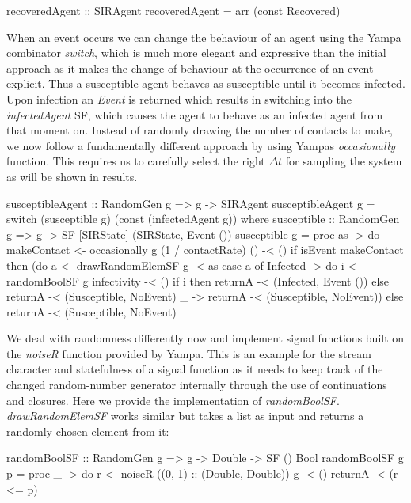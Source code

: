 \begin{HaskellCode}
recoveredAgent :: SIRAgent
recoveredAgent = arr (const Recovered)
\end{HaskellCode}

When an event occurs we can change the behaviour of an agent using the Yampa combinator \textit{switch}, which is much more elegant and expressive than the initial approach as it makes the change of behaviour at the occurrence of an event explicit. Thus a susceptible agent behaves as susceptible until it becomes infected. Upon infection an \textit{Event} is returned which results in switching into the \textit{infectedAgent} SF, which causes the agent to behave as an infected agent from that moment on. Instead of randomly drawing the number of contacts to make, we now follow a fundamentally different approach by using Yampas \textit{occasionally} function. This requires us to carefully select the right $\Delta t$ for sampling the system as will be shown in results. 

\begin{HaskellCode}
susceptibleAgent :: RandomGen g => g -> SIRAgent
susceptibleAgent g = 
    switch (susceptible g) (const (infectedAgent g))
  where
    susceptible :: RandomGen g 
      => g -> SF [SIRState] (SIRState, Event ())
    susceptible g = proc as -> do
      makeContact <- occasionally g (1 / contactRate) () -< ()
      if isEvent makeContact
        then (do
          a <- drawRandomElemSF g -< as
          case a of
            Infected -> do
              i <- randomBoolSF g infectivity -< ()
              if i
                then returnA -< (Infected, Event ())
                else returnA -< (Susceptible, NoEvent)
             _       -> returnA -< (Susceptible, NoEvent))
        else returnA -< (Susceptible, NoEvent)
\end{HaskellCode}

We deal with randomness differently now and implement signal functions built on the \textit{noiseR} function provided by Yampa. This is an example for the stream character and statefulness of a signal function as it needs to keep track of the changed random-number generator internally through the use of continuations and closures. Here we provide the implementation of \textit{randomBoolSF}. \textit{drawRandomElemSF} works similar but takes a list as input and returns a randomly chosen element from it:

\begin{HaskellCode}
randomBoolSF :: RandomGen g => g -> Double -> SF () Bool
randomBoolSF g p = proc _ -> do
  r <- noiseR ((0, 1) :: (Double, Double)) g -< ()
  returnA -< (r <= p)
\end{HaskellCode}

